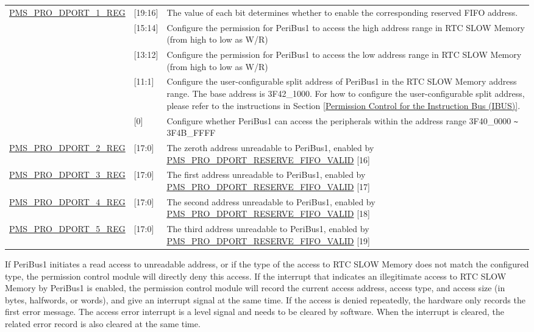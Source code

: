 \documentclass[main\_\_EN.tex]{subfiles}
\begin{document}
\begin{longtable}[h]{|p{4.5cm}|p{2cm}|p{9.5cm}|}
    \hyperref[regdesc:PMSPRODPORT1REG]{PMS\_PRO\_DPORT\_1\_REG} & [19:16] &The value of each bit determines whether to enable the corresponding reserved FIFO address.\\
    \cline{2-3}
    & [15:14] & Configure the permission for PeriBus1 to access the high address range in RTC SLOW Memory (from high to low as W/R)\\
    \cline{2-3}
    & [13:12] & Configure the permission for PeriBus1 to access the low address range in RTC SLOW Memory (from high to low as W/R)\\
    \cline{2-3}
    & [11:1] & Configure the user-configurable split address of PeriBus1 in the RTC SLOW Memory address range. The base address is \hexprefix{}3F42\_1000. For how to configure the user-configurable split address, please refer to the instructions in Section \ref{Permission Control for the Instruction Bus (IBUS)}. \\
    \cline{2-3}
    & [0] & Configure whether PeriBus1 can access the peripherals within the address range \hexprefix{}3F40\_0000 \verb+~+ \hexprefix{}3F4B\_FFFF\\
    \hline
    \hyperref[regdesc:PMSPRODPORT2REG]{PMS\_PRO\_DPORT\_2\_REG} & [17:0] & The zeroth address unreadable to PeriBus1, enabled by \hyperref[fielddesc:PMSPRODPORTRESERVEFIFOVALID]{PMS\_PRO\_DPORT\_RESERVE\_FIFO\_VALID} [16]  \\
    \hline
    \hyperref[regdesc:PMSPRODPORT3REG]{PMS\_PRO\_DPORT\_3\_REG} & [17:0] & The first address unreadable to PeriBus1, enabled by \hyperref[fielddesc:PMSPRODPORTRESERVEFIFOVALID]{PMS\_PRO\_DPORT\_RESERVE\_FIFO\_VALID} [17] \\
    \hline
    \hyperref[regdesc:PMSPRODPORT4REG]{PMS\_PRO\_DPORT\_4\_REG} & [17:0] & The second address unreadable to PeriBus1, enabled by \hyperref[fielddesc:PMSPRODPORTRESERVEFIFOVALID]{PMS\_PRO\_DPORT\_RESERVE\_FIFO\_VALID} [18]\\
    \hline
    \hyperref[regdesc:PMSPRODPORT5REG]{PMS\_PRO\_DPORT\_5\_REG} & [17:0] & The third address unreadable to PeriBus1, enabled by \hyperref[fielddesc:PMSPRODPORTRESERVEFIFOVALID]{PMS\_PRO\_DPORT\_RESERVE\_FIFO\_VALID} [19] \\
\end{longtable}

If PeriBus1 initiates a read access to unreadable address, or if the type of the access to RTC SLOW Memory does not match the configured type, the permission control module will directly deny this access. If the interrupt that indicates an illegitimate access to RTC SLOW Memory by PeriBus1 is enabled, the permission control module will record the current access address, access type, and access size (in bytes, halfwords, or words), and give an interrupt signal at the same time. If the access is denied repeatedly, the hardware only records the first error message. The access error interrupt is a level signal and needs to be cleared by software. When the interrupt is cleared, the related error record is also cleared at the same time.
\end{document}
